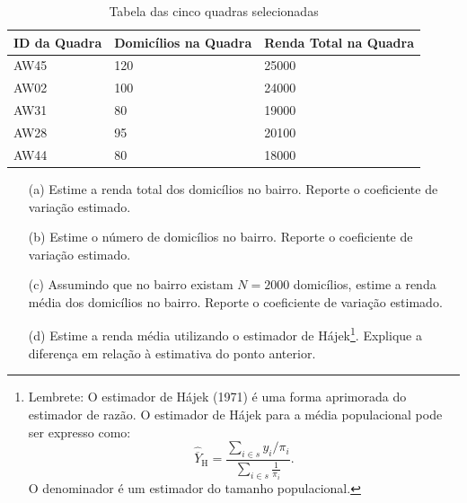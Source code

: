 \documentclass[a4paper,12pt,oneside,twocolumn]{Config/milktest}
\begin{document}
{\small \begin{table}[!htp]
\centering

\begin{tabular}{|p{2cm}|p{2cm}|p{2cm}|}
\hline
\textbf{ID da Quadra} & \textbf{Domicílios na Quadra} & \textbf{Renda Total na Quadra} \\ \hline
AW45 & 120 & 25000 \\ \hline
AW02 & 100 & 24000 \\ \hline
AW31 & 80  & 19000 \\ \hline
AW28 & 95  & 20100 \\ \hline
AW44 & 80  & 18000 \\ \hline
\end{tabular}
\caption{\label{tabela2}Tabela das cinco quadras selecionadas}
\end{table}
}
\begin{itemize}
    \item[(a)] Estime a renda total dos domicílios no bairro. Reporte o coeficiente de variação estimado.
    \item[(b)] Estime o número de domicílios no bairro. Reporte o coeficiente de variação estimado.
    \item[(c)] Assumindo que no bairro existam \(N = 2000\) domicílios, estime a renda média dos domicílios no bairro. Reporte o coeficiente de variação estimado.
    \item[(d)] Estime a renda média utilizando o estimador de Hájek\footnote{Lembrete: O estimador de Hájek (1971) é uma forma aprimorada do estimador de razão. O estimador de Hájek para a média populacional pode ser expresso como: \[
\widehat{\overline{Y}}_{\text{H}} = \frac{\sum_{i \in s} y_i/\pi_i}{\sum_{i \in s} \frac{1}{\pi_i}}.
\] O denominador é um estimador do tamanho populacional.}. Explique a diferença em relação à estimativa do ponto anterior. 
    
\end{itemize}
\end{document}
